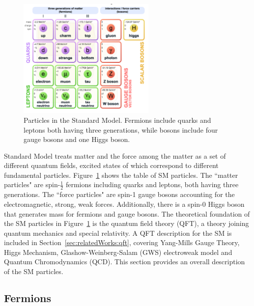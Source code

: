 \begin{figure}[ht]
    \centering
    \includegraphics[width=0.6\textwidth]{chapters/RelatedWorks/sectionSMParticles/figures/sm.png}
    \caption{Particles in the Standard Model. Fermions include quarks and leptons both having three generations, while bosons include four gauge bosons and one Higgs boson.}
    \label{fig:relatedWorks:smParticles:sm}
\end{figure}

Standard Model treats matter and the force among the matter as a set of different quantum fields, excited states of which correspond to different fundamental particles. Figure~\ref{fig:relatedWorks:smParticles:sm} shows the table of SM particles. The ``matter particles" are  spin-$\frac{1}{2}$ fermions including quarks and leptons, both having three generations. The ``force particles" are spin-1 gauge bosons accounting for the electromagnetic, strong, weak forces. Additionally, there is a spin-0 Higgs boson that generates mass for fermions and gauge bosons. The theoretical foundation of the SM particles in Figure~\ref{fig:relatedWorks:smParticles:sm} is the quantum field theory (QFT), a theory joining quantum mechanics and special relativity.  A QFT description for the SM is included in Section~\ref{sec:relatedWorks:qft}, covering Yang-Mills Gauge Theory, Higgs Mechanism, Glashow-Weinberg-Salam (GWS) electroweak model and Quantum Chromodynamics (QCD). This section provides an overall description of the SM particles. 


\subsection{Fermions}
\label{sec:relatedWorks:smParticles:fermion}

